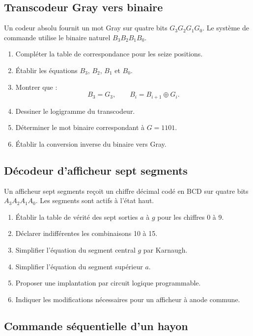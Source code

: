 \subsection{Transcodeur Gray vers binaire}

Un codeur absolu fournit un mot Gray sur quatre bits $G_3G_2G_1G_0$. Le système de commande utilise le binaire naturel $B_3B_2B_1B_0$.

\begin{enumerate}
  \item Compléter la table de correspondance pour les seize positions.
  \item Établir les équations $B_3$, $B_2$, $B_1$ et $B_0$.
  \item Montrer que :
  \[
  B_3=G_3,
  \qquad B_i=B_{i+1}\oplus G_i.
  \]
  \item Dessiner le logigramme du transcodeur.
  \item Déterminer le mot binaire correspondant à $G=1101$.
  \item Établir la conversion inverse du binaire vers Gray.
\end{enumerate}

\subsection{Décodeur d'afficheur sept segments}

Un afficheur sept segments reçoit un chiffre décimal codé en BCD sur quatre bits $A_3A_2A_1A_0$. Les segments sont actifs à l'état haut.

\begin{enumerate}
  \item Établir la table de vérité des sept sorties $a$ à $g$ pour les chiffres 0 à 9.
  \item Déclarer indifférentes les combinaisons 10 à 15.
  \item Simplifier l'équation du segment central $g$ par Karnaugh.
  \item Simplifier l'équation du segment supérieur $a$.
  \item Proposer une implantation par circuit logique programmable.
  \item Indiquer les modifications nécessaires pour un afficheur à anode commune.
\end{enumerate}

\subsection{Commande séquentielle d'un hayon}


